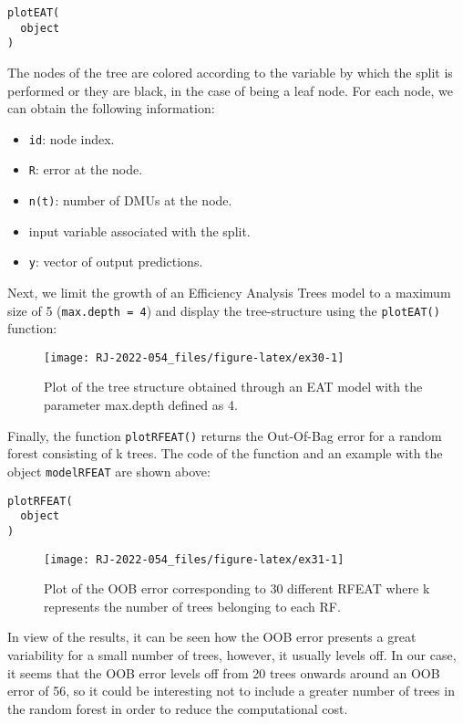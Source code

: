 \begin{verbatim}
plotEAT(
  object
)
\end{verbatim}

The nodes of the tree are colored according to the variable by which the split is performed or they are black, in the case of being a leaf node. For each node, we can obtain the following information:

\begin{itemize}
\item
  \texttt{id}: node index.
\item
  \texttt{R}: error at the node.
\item
  \texttt{n(t)}: number of DMUs at the node.
\item
  input variable associated with the split.
\item
  \texttt{y}: vector of output predictions.
\end{itemize}

Next, we limit the growth of an Efficiency Analysis Trees model to a maximum size of 5 (\texttt{max.depth\ =\ 4}) and display the tree-structure using the \texttt{plotEAT()} function:

\begin{figure}

{\centering \texttt{[image: RJ-2022-054\_files/figure-latex/ex30-1]} 

}

\caption{Plot of the tree structure obtained through an EAT model with the parameter max.depth defined as 4.}\label{fig:ex30}
\end{figure}

Finally, the function \texttt{plotRFEAT()} returns the Out-Of-Bag error for a random forest consisting of k trees. The code of the function and an example with the object \texttt{modelRFEAT} are shown above:

\begin{verbatim}
plotRFEAT(
  object
)
\end{verbatim}

\begin{figure}

{\centering \texttt{[image: RJ-2022-054\_files/figure-latex/ex31-1]} 

}

\caption{Plot of the OOB error corresponding to 30 different RFEAT where k represents the number of trees belonging to each RF.}\label{fig:ex31}
\end{figure}

In view of the results, it can be seen how the OOB error presents a great variability for a small number of trees, however, it usually levels off. In our case, it seems that the OOB error levels off from 20 trees onwards around an OOB error of 56, so it could be interesting not to include a greater number of trees in the random forest in order to reduce the computational cost.

